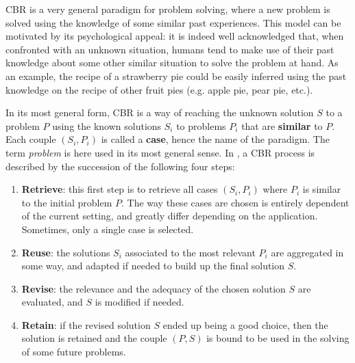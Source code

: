 CBR is a very general paradigm for problem solving, where a new problem is
solved using the knowledge of some similar past experiences. This model can be
motivated by its psychological appeal: it is indeed well acknowledged that,
when confronted with an unknown situation, humans tend to make use of their
past knowledge about some other similar situation to solve the problem at hand.
As an example, the recipe of a strawberry pie could be easily inferred using
the past knowledge on the recipe of other fruit pies (e.g. apple pie, pear pie,
etc.).

In its most general form, CBR is a way of reaching the unknown solution $S$ to a
problem $P$ using the known solutions $S_i$ to problems $P_i$ that are
\textbf{similar} to $P$. Each couple $(S_i, P_i)$ is called a \textbf{case},
hence the name of the paradigm.  The term \textit{problem} is here used in its
most general sense.  In \cite{AamPla94}, a CBR process is described by the
succession of the following four steps:
\begin{enumerate}
  \item \textbf{Retrieve}: this first step is to retrieve all cases $(S_i,
    P_i)$ where $P_i$ is similar to the initial problem $P$. The way these
    cases are chosen is entirely dependent of the current setting, and greatly
    differ depending on the application. Sometimes, only a single case  is
    selected.
  \item \textbf{Reuse}: the solutions $S_i$ associated to the most relevant
    $P_i$ are aggregated in some way, and adapted if needed to build up the
    final solution $S$.
  \item \textbf{Revise}: the relevance and the adequacy of the chosen solution
    $S$ are evaluated, and $S$ is modified if needed.
  \item \textbf{Retain}: if the revised solution $S$ ended up being a good
    choice, then the solution is retained and the couple $(P, S)$ is bound to
    be used in the solving of some future problems.
\end{enumerate}



